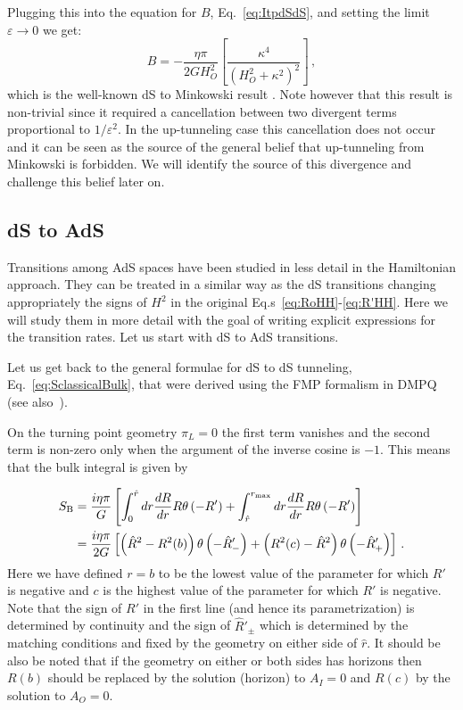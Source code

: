\documentclass[a4paper,11pt]{article}
\numberwithin{equation}{section}
\newcommand{\citep}{\cite}
\newcommand{\be}{\begin{equation}}
\newcommand{\ee}{\end{equation}}
\numberwithin{equation}{section}
\begin{document}
Plugging this into the equation for $B$, Eq.~\eqref{eq:ItpdSdS}, and setting the limit $\varepsilon\rightarrow 0$ we get:
\be
\boxed{B=-\frac{\eta\pi}{2GH_O^2}\left[\frac{\kappa^4}{\left(H_O^2+\kappa^2\right)^2}\right]} \,,
\ee
which is the well-known dS to Minkowski result \citep{Fischler:1990pk,Coleman:1980aw,Bachlechner:2016mtp,DeAlwis:2019rxg}. Note however that this result is non-trivial since it required a cancellation between two divergent terms proportional to $1/\varepsilon^2$. In the up-tunneling case this cancellation does not occur and it can be seen as the source of the general belief that up-tunneling from Minkowski is forbidden. We will identify the source of this divergence and challenge this belief later on. 




\subsection{dS to AdS}
Transitions among AdS spaces have  been studied in less detail in the Hamiltonian approach.  They can be treated in a similar way as the dS transitions changing appropriately the signs of $H^2$ in the original Eq.s~\eqref{eq:RoHH}-\eqref{eq:R'HH}. Here we will study them in more detail with the goal of writing explicit expressions for the transition rates. Let us start with dS to AdS transitions.


Let us get back to the general formulae for dS to dS tunneling, Eq.~\eqref{eq:SclassicalBulk}, that
were derived using the FMP
formalism in DMPQ (see also~\citep{Bachlechner:2016mtp}). 

On the turning point geometry $\pi_{L}=0$ the first term vanishes
and the second term is non-zero only when the argument of the inverse
cosine is $-1$. This means that the bulk integral is given by

\begin{align}
S_{{\rm B}} & =\frac{i\eta\pi}{G}\left[\int_{0}^{\hat{r}}dr\frac{dR}{dr}R\theta\left(-R'\right)+\int_{\hat{r}}^{r_{\rm max}}dr\frac{dR}{dr}R\theta\left(-R'\right)\right]\label{eq:Bulk-2}\\
 & =\frac{i\eta\pi}{2G}\left[\left(\hat{R}^{2}-R^{2}(b)\right)\theta\left(-\hat{R}'_{-}\right)+\left(R_{{\rm }}^{2}(c)-\hat{R}^{2}\right)\theta\left(-\hat{R}'_{+}\right)\right] \,.\label{eq:Bulk-3}
\end{align}
Here we have defined $r=b$ to be the lowest value of the parameter for which $R'$ is negative and $c$ is the highest value of the parameter for which $R'$ is negative. Note that the sign of $R'$ in the first line (and hence its parametrization) is determined by continuity
and the sign of $\hat{R}'_{\pm}$ which is determined by the matching
conditions and fixed by the geometry on either side of $\hat{r}$.
It should be also be noted that if the geometry on either or both
sides has horizons then $R(b)$ should be replaced by the solution
(horizon) to $A_{I}=0$ and $R(c)$ by the solution to $A_{O}=0$.
\end{document}
